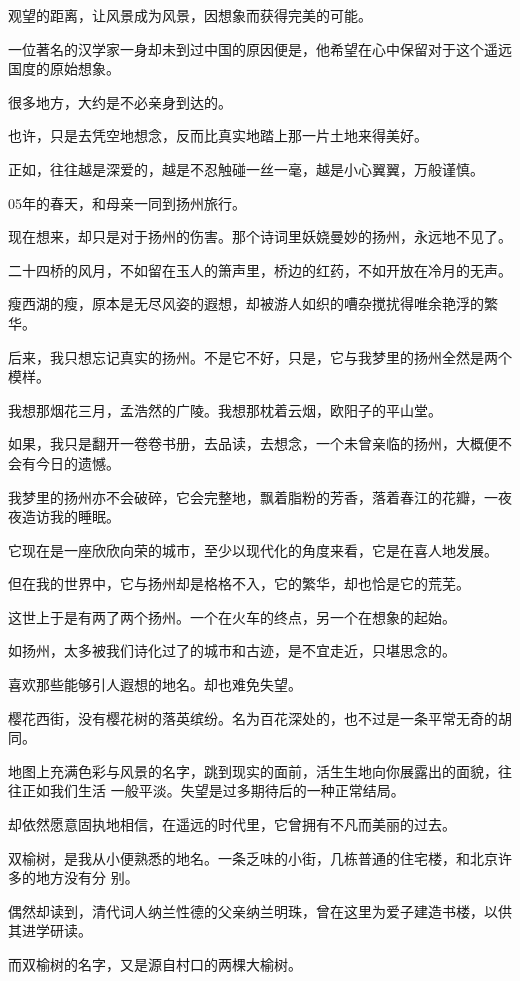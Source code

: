 		观望的距离，让风景成为风景，因想象而获得完美的可能。\par
		一位著名的汉学家一身却未到过中国的原因便是，他希望在心中保留对于这个遥远国度的原始想象。

		很多地方，大约是不必亲身到达的。\par
		也许，只是去凭空地想念，反而比真实地踏上那一片土地来得美好。\par
		正如，往往越是深爱的，越是不忍触碰一丝一毫，越是小心翼翼，万般谨慎。

		05年的春天，和母亲一同到扬州旅行。\par
		现在想来，却只是对于扬州的伤害。那个诗词里妖娆曼妙的扬州，永远地不见了。

		二十四桥的风月，不如留在玉人的箫声里，桥边的红药，不如开放在冷月的无声。\par
		瘦西湖的瘦，原本是无尽风姿的遐想，却被游人如织的嘈杂搅扰得唯余艳浮的繁华。\par
		后来，我只想忘记真实的扬州。不是它不好，只是，它与我梦里的扬州全然是两个模样。\par
		我想那烟花三月，孟浩然的广陵。我想那枕着云烟，欧阳子的平山堂。\par
		如果，我只是翻开一卷卷书册，去品读，去想念，一个未曾亲临的扬州，大概便不会有今日的遗憾。\par
		我梦里的扬州亦不会破碎，它会完整地，飘着脂粉的芳香，落着春江的花瓣，一夜夜造访我的睡眠。\par
		它现在是一座欣欣向荣的城市，至少以现代化的角度来看，它是在喜人地发展。\par
		但在我的世界中，它与扬州却是格格不入，它的繁华，却也恰是它的荒芜。\par
		这世上于是有两了两个扬州。一个在火车的终点，另一个在想象的起始。

		如扬州，太多被我们诗化过了的城市和古迹，是不宜走近，只堪思念的。

		喜欢那些能够引人遐想的地名。却也难免失望。\par
		樱花西街，没有樱花树的落英缤纷。名为百花深处的，也不过是一条平常无奇的胡同。

		地图上充满色彩与风景的名字，跳到现实的面前，活生生地向你展露出的面貌，往往正如我们生活
	一般平淡。失望是过多期待后的一种正常结局。

		却依然愿意固执地相信，在遥远的时代里，它曾拥有不凡而美丽的过去。

		双榆树，是我从小便熟悉的地名。一条乏味的小街，几栋普通的住宅楼，和北京许多的地方没有分
	别。

		偶然却读到，清代词人纳兰性德的父亲纳兰明珠，曾在这里为爱子建造书楼，以供其进学研读。\par
		而双榆树的名字，又是源自村口的两棵大榆树。

